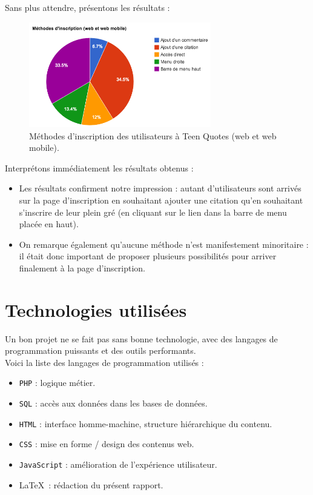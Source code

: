 \documentclass{report}
\begin{document}
	Sans plus attendre, présentons les résultats :
	\begin{figure}[H]
		\center
		\includegraphics[width=300px]{images/methodesDInscription.png}
		\caption{Méthodes d'inscription des utilisateurs à Teen Quotes (web et web mobile).}
	\end{figure}
	Interprétons immédiatement les résultats obtenus :
	\vspace{10px}
	\begin{itemize}
		\item Les résultats confirment notre impression : autant d'utilisateurs sont arrivés sur la page d'inscription en souhaitant ajouter une citation qu'en souhaitant s'inscrire de leur plein gré (en cliquant sur le lien dans la barre de menu placée en haut).
		\item On remarque également qu'aucune méthode n'est manifestement minoritaire : il était donc important de proposer plusieurs possibilités pour arriver finalement à la page d'inscription.
	\end{itemize}
	\vspace{10px}
	 
	\chapter{Technologies utilisées}
	Un bon projet ne se fait pas sans bonne technologie, avec des langages de programmation puissants et des outils performants.\\

	Voici la liste des langages de programmation utilisés :
	\vspace{10px}
	\begin{itemize}
		\item \texttt{PHP} : logique métier.
		\item \texttt{SQL} : accès aux données dans les bases de données.
		\item \texttt{HTML} : interface homme-machine, structure hiérarchique du contenu.
		\item \texttt{CSS} : mise en forme / design des contenus web.
		\item \texttt{JavaScript} : amélioration de l'expérience utilisateur.
		\item \LaTeX\ : rédaction du présent rapport.
	\end{itemize}
	\vspace{10px}
\end{document}
